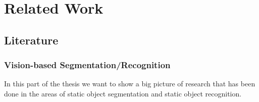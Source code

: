 \chapter{Related Work}
\label{chapter:Related Work}


\section{Literature}
\subsection{Vision-based Segmentation/Recognition}














In this part of the thesis we want to show a big picture of research that has been done in the areas of static object segmentation and static object recognition. 

